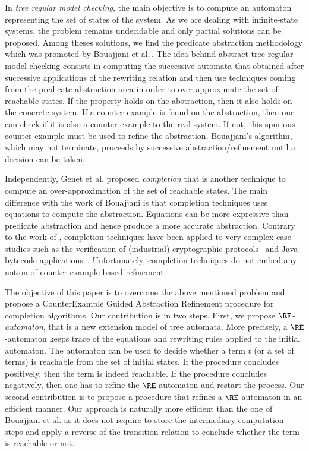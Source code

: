 In {\em tree regular model checking}, the main objective is to compute
an automaton representing the set of states of the system. As we are
dealing with infinite-state systems, the problem remains undecidable
and only partial solutions can be proposed. Among theses solutions, we
find the predicate abstraction methodology which was promoted by
Bouajjani et al.\,\cite{BHRV06a,BHRV06b}. The idea behind abstract
tree regular model checking consists in computing the successive
automata that obtained after successive applications of the rewriting
relation and then use techniques coming from the predicate abstraction
area in order to over-approximate the set of reachable states. If the
property holds on the abstraction, then it also holds on the concrete
system. If a counter-example is found on the abstraction, then one can
check if it is also a counter-example to the real system. If not, this
spurious counter-example must be used to refine the
abstraction. Bouajjani's algorithm, which may not terminate, proceeds
by successive abstraction/refinement until a decision can be
taken. 

Independently, Genet et al. proposed {\em completion} that is another
technique to compute an over-approximation of the set of reachable
states. The main difference with the work of Bouajjani is that
completion techniques uses equations to compute the
abstraction. Equations can be more expressive than predicate
abstraction and hence produce a more accurate abstraction. Contrary to
the work of \cite{BHRV06a,BHRV06b}, completion techniques have been
applied to very complex case studies such as the verification of
(industrial) cryptographic
protocols~\cite{GenetK-CADE00,GenetTTVTT-wits03,avispa} and Java
bytecode applications~\cite{BoichutGJL-RTA07}. Unfortunately,
completion techniques do not embed any notion of counter-example based
refinement.

The objective of this paper is to overcome the above mentioned problem
and propose a CounterExample Guided Abstraction Refinement procedure
for completion algorithms.    Our
contribution is in two steps. First, we propose {\em $\RE$-automaton},
that is a new extension model of tree automata. More precisely, a
$\RE$-automaton keeps trace of the equations and rewriting rules
applied to the initial automaton. The automaton can be used to decide
whether a term $t$ (or a set of terms) is reachable from the set of
initial states. If the procedure concludes positively, then the term
is indeed reachable. If the procedure concludes negatively, then one
has to refine the $\RE$-automaton and restart the process. Our second
contribution is to propose a procedure that refines a $\RE$-automaton
in an efficient manner. Our approach is naturally more efficient than
the one of Bouajjani et al. as it does not require to store the
intermediary computation steps and apply a reverse of the transition
relation to conclude whether the term is reachable or not.



